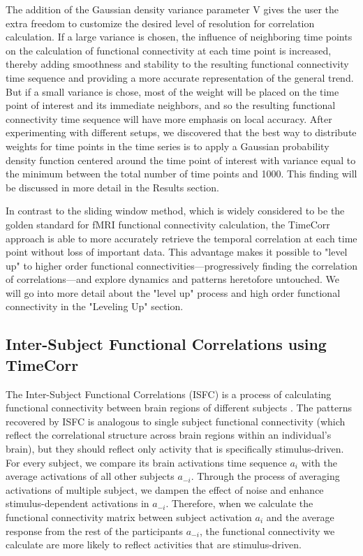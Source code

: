 \documentclass[11pt]{article}
\begin{document}
The addition of the Gaussian density variance parameter V gives the user the extra freedom to customize the desired level of resolution for correlation calculation. If a large variance is chosen, the influence of neighboring time points on the calculation of functional connectivity at each time point is increased, thereby adding smoothness and stability to the resulting functional connectivity time sequence and providing a more accurate representation of the general trend. But if a small variance is chose, most of the weight will be placed on the time point of interest and its immediate neighbors, and so the resulting functional connectivity time sequence will have more emphasis on local accuracy. After experimenting with different setups, we discovered that the best way to distribute weights for time points in the time series is to apply a Gaussian probability density function centered around the time point of interest with variance equal to the minimum between the total number of time points and 1000. This finding will be discussed in more detail in the Results section.

In contrast to the sliding window method, which is widely considered to be the golden standard for fMRI functional connectivity calculation, the TimeCorr approach is able to more accurately retrieve the temporal correlation at each time point without loss of important data. This advantage makes it possible to "level up" to higher order functional connectivities---progressively finding the correlation of correlations---and explore dynamics and patterns heretofore untouched. We will go into more detail about the "level up" process and high order functional connectivity in the "Leveling Up" section.

\subsection{Inter-Subject Functional Correlations using TimeCorr}

The Inter-Subject Functional Correlations (ISFC) is a process of calculating functional connectivity between brain regions of different subjects \cite{jeremy2017}\cite{hasson2016}. The patterns recovered by ISFC is analogous to single subject functional connectivity (which reflect the correlational structure across brain regions within an individual's
brain), but they should reflect only activity that is specifically stimulus-driven. For every subject, we compare its brain activations time sequence $a_i$ with the average activations of all other subjects $a_{-i}$. Through the process of averaging activations of multiple subject, we dampen the effect of noise and enhance stimulus-dependent activations in $a_{-i}$. Therefore, when we calculate the functional connectivity matrix between subject activation $a_i$ and the average response from the rest of the participants $a_{-i}$, the functional connectivity we calculate are more likely to reflect activities that are stimulus-driven.
\end{document}
